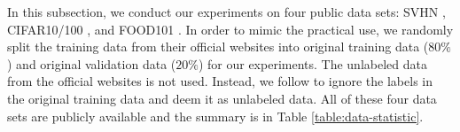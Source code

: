 \documentclass{article}
\begin{document}
In this subsection, we conduct our experiments on four public data sets: {\sf SVHN} \cite{YN11a}, {\sf CIFAR10/100} \cite{AK09a}, and {\sf FOOD101} \cite{LB14a}.
In order to mimic the practical use, we randomly split the training data from their official websites into original training data ($80\%$) and original validation data ($20\%$) for our experiments.
The unlabeled data from the official websites is not used. Instead, we follow \cite{KS20a} to ignore the labels in the original training data and deem it as unlabeled data.
All of these four data sets are publicly available
and the summary is in Table \ref{table:data-statistic}.
\begin{table}[t]
    \centering
    \caption{Summary of four public data sets.
        \#class is the number of classes, \#train
        is the number of the train data, \#validation is the number of the validation data,
        \#test is the number of the test data.
    }
\label{table:data-statistic}
\end{table}
\end{document}
